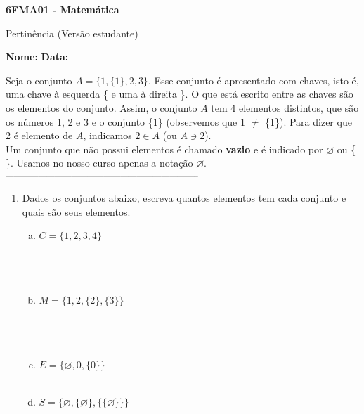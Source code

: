 \documentclass[a4paper,14pt]{article}
\begin{document}
	
	\noindent\textbf{6FMA01 - Matemática} 
	
	\begin{center}Pertinência (Versão estudante)
	\end{center}
	
	\noindent\textbf{Nome:} \underline{\hspace{10cm}}
	\noindent\textbf{Data:} \underline{\hspace{4cm}}
	
	
	\begin{multicols}{2}
		\noindent Seja o conjunto $A = \{1, \{1\}, 2, 3\}$. Esse conjunto é apresentado com chaves, isto é, uma chave à esquerda \{ e uma à direita \}. O que está escrito entre as chaves são os elementos do conjunto. Assim, o conjunto $A$ tem 4 elementos distintos, que são os números 1, 2 e 3 e o conjunto \{1\} (observemos que 1 $\neq$ \{1\}). Para dizer que 2 é elemento de $A$, indicamos $2 \in A$ (ou $A \ni 2$). \\
		Um conjunto que não possui elementos é chamado \textbf{vazio} e é indicado por $\varnothing$ ou \{ \}. Usamos no nosso curso apenas a notação $\varnothing$.
		\noindent\textsubscript{-----------------------------------------------------------------------}
		\begin{enumerate}
			\item Dados os conjuntos abaixo, escreva quantos elementos tem cada conjunto e quais são seus elementos.
			\begin{enumerate}[a)]
				\item $C = \{1, 2, 3, 4\}$ \\\\\\\\
				\item $M = \{1, 2, \{2\}, \{3\}\}$ \\\\\\\\
				\item $E = \{\varnothing, 0, \{0\}\}$ \\\\
				\item $S = \{\varnothing, \{\varnothing\}, \{\{\varnothing\}\}\}$ \\\\\\\\

\end{enumerate}
\end{enumerate}
\end{multicols}
\end{document}
